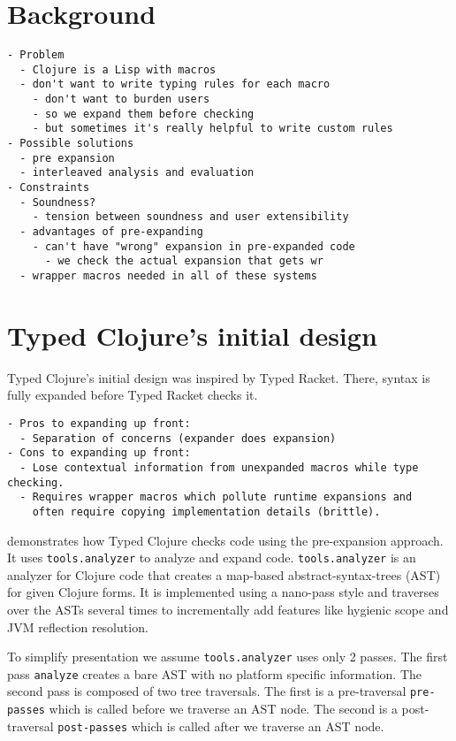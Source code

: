 \chapter{Background}

{
\singlespacing
\begin{verbatim}
- Problem
  - Clojure is a Lisp with macros
  - don't want to write typing rules for each macro
    - don't want to burden users
    - so we expand them before checking
    - but sometimes it's really helpful to write custom rules
- Possible solutions
  - pre expansion
  - interleaved analysis and evaluation
- Constraints
  - Soundness?
    - tension between soundness and user extensibility
  - advantages of pre-expanding
    - can't have "wrong" expansion in pre-expanded code
      - we check the actual expansion that gets wr
  - wrapper macros needed in all of these systems
\end{verbatim}
}

\chapter{Typed Clojure's initial design}

Typed Clojure's initial design was inspired by Typed Racket.
There, syntax is fully expanded before Typed Racket checks it.

{
\singlespacing
\begin{verbatim}
- Pros to expanding up front:
  - Separation of concerns (expander does expansion)
- Cons to expanding up front:
  - Lose contextual information from unexpanded macros while type checking.
  - Requires wrapper macros which pollute runtime expansions and
    often require copying implementation details (brittle).
\end{verbatim}
}

 demonstrates 
how Typed Clojure checks code using the pre-expansion approach.
It uses \texttt{tools.analyzer} to analyze and expand code.
\texttt{tools.analyzer} is an analyzer for Clojure code that creates
a map-based abstract-syntax-trees (AST) for given Clojure forms.
It is implemented using a nano-pass style and traverses over the ASTs
several times to incrementally add features like hygienic scope
and JVM reflection resolution.

To simplify presentation we assume \texttt{tools.analyzer}
uses only 2 passes. The first pass \texttt{analyze} creates
a bare AST with no platform specific information.
The second pass is composed of two tree traversals.
The first is a pre-traversal \texttt{pre-passes} which
is called before we traverse an AST node.
The second is a post-traversal \texttt{post-passes} which
is called after we traverse an AST node.

